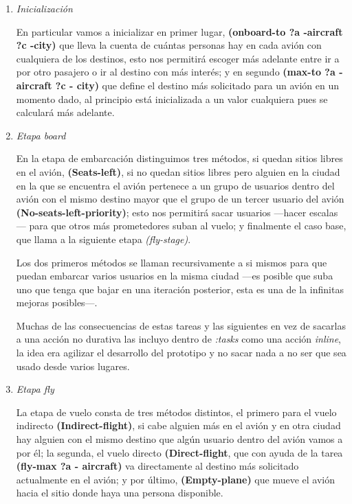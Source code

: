 \documentclass{article}
\begin{document}
\begin{enumerate}
\begin{enumerate}
		\item \emph{Inicialización}
		
		En particular vamos a inicializar en primer lugar, \textbf{(onboard-to ?a -aircraft ?c -city)} que lleva la cuenta de cuántas personas hay en cada avión con cualquiera de los destinos, esto nos permitirá escoger más adelante entre ir a por otro pasajero o ir al destino con más interés; y en segundo \textbf{(max-to ?a - aircraft ?c - city)} que define el destino más solicitado para un avión en un momento dado, al principio está inicializada a un valor cualquiera pues se calculará más adelante.
		
		\item \emph{Etapa board}
		
		En la etapa de embarcación distinguimos tres métodos, si quedan sitios libres en el avión, \textbf{(Seats-left)}, si no quedan sitios libres pero alguien en la ciudad en la que se encuentra el avión pertenece a un grupo de usuarios dentro del avión con el mismo destino mayor que el grupo de un tercer usuario del avión \textbf{(No-seats-left-priority)}; esto nos permitirá sacar usuarios ---hacer escalas--- para que otros más prometedores suban al vuelo; y finalmente el caso base, que llama a la siguiente etapa \emph{(fly-stage)}. 
		
		Los dos primeros métodos se llaman recursivamente a si mismos para que puedan embarcar varios usuarios en la misma ciudad ---es posible que suba uno que tenga que bajar en una iteración posterior, esta es una de la infinitas mejoras posibles---.
		
		Muchas de las consecuencias de estas tareas y las siguientes en vez de sacarlas a una acción no durativa las incluyo dentro de \emph{:tasks} como una acción \emph{inline}, la idea era agilizar el desarrollo del prototipo y no sacar nada a no ser que sea usado desde varios lugares.
		
		\item \emph{Etapa fly}
		
		La etapa de vuelo consta de tres métodos distintos, el primero para el vuelo indirecto \textbf{(Indirect-flight)}, si cabe alguien más en el avión y en otra ciudad hay alguien con el mismo destino que algún usuario dentro del avión vamos a por él; la segunda, el vuelo directo	\textbf{(Direct-flight}, que con ayuda de la tarea \textbf{(fly-max ?a - aircraft)} va directamente al destino más solicitado actualmente en el avión; y por último, \textbf{(Empty-plane)} que mueve el avión hacia el sitio donde haya una persona disponible.
		

\end{enumerate}
\end{enumerate}
\end{document}
